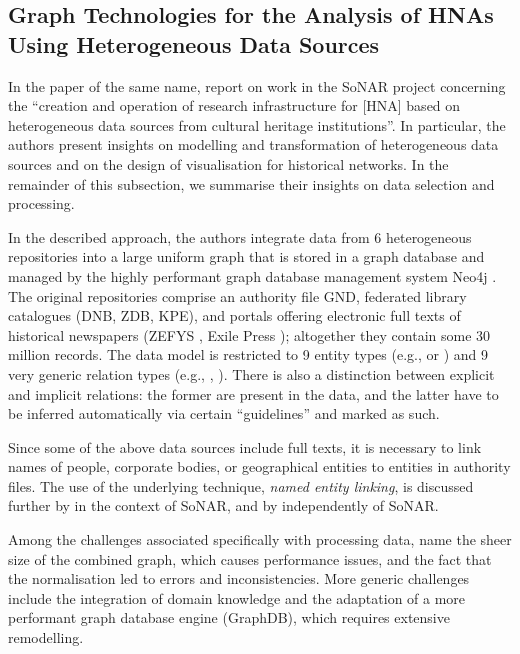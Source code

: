 \subsection{Graph Technologies for the Analysis of HNAs Using Heterogeneous Data Sources}

In the paper of the same name, \textcite{Menzel2020} report on
work in the \gls{SoNAR} project concerning the 
\enquote{creation and operation of research infrastructure
for [\gls{HNA}] based on heterogeneous data sources from cultural heritage institutions}.
In particular, the authors present insights on modelling and transformation
of heterogeneous data sources and on the design of visualisation for historical networks.
In the remainder of this subsection,
we summarise their insights on data selection and processing.

In the described approach, the authors integrate data from 6 heterogeneous repositories
into a large uniform graph that is stored in a graph database
and managed by the highly performant graph database management system Neo4j \autocite{Neo4j}.
The original repositories comprise an authority file \gls{GND},
federated library catalogues (\gls{DNB}, \gls{ZDB}, \gls{KPE}), %
and portals offering electronic full texts of historical newspapers 
%
(\gls{ZEFYS} \autocite{ZEFYS}, Exile Press \autocite{ExilePress});
altogether they contain some 30 million records.
The data model is restricted to 9 entity types (e.g.,  or )
and 9 very generic relation types (e.g., , ).
There is also a distinction between explicit and implicit relations:
the former are present in the data, and the latter have to be inferred automatically via
certain \enquote{guidelines} and marked as such.

Since some of the above data sources include full texts,
it is necessary to link names of people, corporate bodies, or geographical entities
to entities in authority files. The use of the underlying technique,
\emph{named entity linking}, is discussed further by \textcite{Menzel2021}
in the context of \gls{SoNAR},
and by \textcite{Meiners2022} independently of \gls{SoNAR}.

Among the challenges associated specifically with processing data,
\textcite{Menzel2020} name
the sheer size of the combined graph, which causes performance issues,
and the fact that the normalisation led to errors and inconsistencies.
More generic challenges include the integration of domain knowledge
and the adaptation of a more performant graph database engine (GraphDB),
which requires extensive remodelling.

